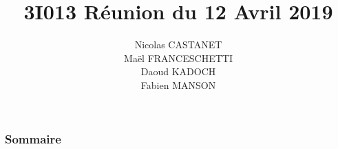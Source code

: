 \documentclass{beamer}
\title{3I013 Réunion du 12 Avril 2019}
\author{Nicolas CASTANET\\Maël FRANCESCHETTI\\Daoud KADOCH\\Fabien MANSON\\}
\begin{document}
	\begin{frame}
		\begin{center}
		\date{}
		\maketitle
		\end{center}
	\end{frame}
	
	
	\begin{frame}
		\section{}
		\begin{center}
		\frametitle{Sommaire}
		\tableofcontents{}
		\end{center}
	\end{frame}
	
	
\end{document}
